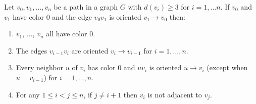 \begin{lemma}[3-chaining]\label{lem:3-chaining}Let $v_0, v_1, \dotsc, v_n$ be a path in a graph $G$ with $d(v_i) \geq 3$ for $i=1,\dotsc n$. If $v_0$ and $v_1$ have color $0$ and the edge $v_{0} v_{1}$ is oriented $v_{1} \rightarrow v_{0}$ then:
	\begin{enumerate}
		\item $v_1$, $\dotsc$, $v_n$ all have color $0$.
		\item The edges $v_{i-1} v_{i}$ are oriented $v_{i} \rightarrow v_{i-1}$ for $i = 1,\dotsc, n$.
		\item Every neighbor $u$ of $v_i$ has color $0$ and $uv_{i}$ is oriented $u \rightarrow v_{i}$ (except when $u = v_{i-1}$) for $i = 1, \dotsc, n$.
		\item For any $1 \leq i < j \leq n$, if $j \neq i+1$ then $v_i$ is not adjacent to $v_j$.
	\end{enumerate}
\end{lemma}
